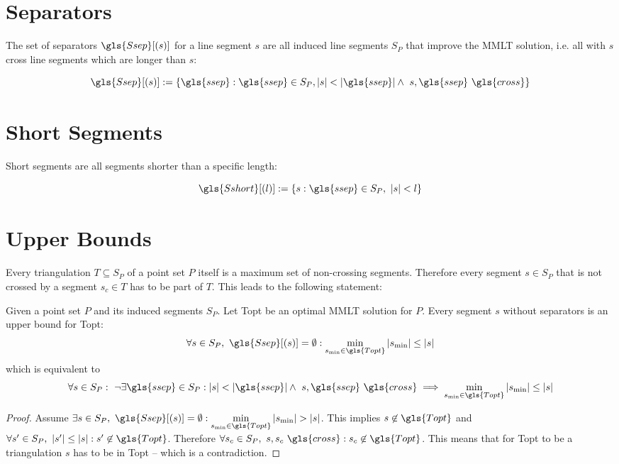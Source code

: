 \section{Separators}\label{sec:pre_separators}
The set of separators \(\gls{Ssep}[(s)]\) for a line segment
\(s\) are all induced line segments \(S_P\) that improve the
\gls{MMLT} solution, i.e. all with \(s\) \gls{cross} line segments
which are longer than \(s\):

\[
	\gls{Ssep}[(s)] := \{
		\gls{ssep} : \gls{ssep}\in S_P,
		|s| < |\gls{ssep}|\land~ s,\gls{ssep}~\gls{cross}
	\}
\]

\section{Short Segments}\label{sec:pre_short_segments}
Short segments are all segments shorter than a specific length:

\[
  \gls{Sshort}[(l)] := \{ s : \gls{ssep}\in S_P,~ |s| < l \}
\]



\section{Upper Bounds}
Every triangulation \(T\subseteq S_P\) of a point set \(P\) itself is
a maximum set of non-crossing segments. Therefore every segment 
\(s \in S_P\) that is not crossed by a segment \(s_c \in T\) has
to be part of \(T\). This leads to the following statement:

\begin{theorem}\label{thm:upper_bound}
  Given a point set \(P\) and its induced segments \(S_P\). Let
  \gls{Topt} be an optimal \gls{MMLT} solution for \(P\). Every
  segment \(s\) without separators is an upper bound for \gls{Topt}:
  \[
    \forall s \in S_P,~ \gls{Ssep}[(s)] = \emptyset :
    \min\limits_{s_{\min} \in \gls{Topt}} |s_{\min}| \leq |s|
  \]
  which is equivalent to
  \[
    \forall s \in S_P:~ \lnot\exists \gls{ssep} \in S_P :
    |s| < |\gls{ssep}| \land~ s, \gls{ssep}~ \gls{cross}
    \implies \min\limits_{s_{\min} \in \gls{Topt}} |s_{\min}| \leq |s|
  \]
\end{theorem}

\begin{proof}
  Assume \(
    \exists s \in S_P,~ \gls{Ssep}[(s)] = \emptyset :
    \min\limits_{s_{\min} \in \gls{Topt}} |s_{\min}| > |s|
  \). This implies \(s \not\in \gls{Topt}\) and
  \(\forall s' \in S_P,~ |s'| \leq |s| : s' \not\in \gls{Topt}\).
  Therefore \(\forall s_c \in S_P,~
   s, s_c~\gls{cross} : s_c \not\in \gls{Topt}\). This means 
   that for \gls{Topt} to be a triangulation \(s\) has to be in
   \gls{Topt} -- which is a contradiction.
\end{proof}


